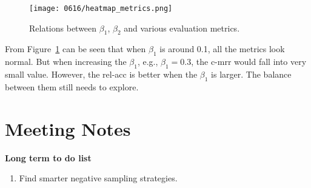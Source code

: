 \begin{figure}[!ht]
    \centering
    \texttt{[image: 0616/heatmap\_metrics.png]}
    \caption{Relations between $\beta_1$, $\beta_2$ and various evaluation metrics.}
    \label{fig:heatmap_metrics}
\end{figure}
From Figure~\ref{fig:heatmap_metrics} can be seen that when $\beta_1$ is around 0.1, all the metrics look normal. But when increasing the $\beta_1$, e.g., $\beta_1 = 0.3$, the c-mrr would fall into very small value. However, the rel-acc is better when the $\beta_1$ is larger. The balance between them still needs to explore.

\clearpage
\section{Meeting Notes}
\textbf{Long term to do list}
\begin{enumerate}
    \item Find smarter negative sampling strategies.
\end{enumerate}

